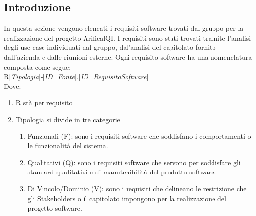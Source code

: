 

\subsection{Introduzione}
In questa sezione vengono elencati i requisiti software trovati dal gruppo per la realizzazione del progetto ArificalQI.
I requisiti sono stati trovati tramite l'analisi degli use case individuati dal gruppo, dal'analisi del capitolato fornito dall'azienda
e dalle riunioni esterne.
Ogni requisito software ha una nomenclatura composta come segue:\\[1em]
R[\textit{Tipologia}]-[\textit{ID\_Fonte}].[\textit{ID\_RequisitoSoftware}]\\[1em]
Dove:
\begin{enumerate}
    \item R stà per requisito
    \item Tipologia si divide in tre categorie
    \begin{enumerate}
        \item Funzionali (F): sono i requisiti software che soddisfano i comportamenti o le funzionalità del sistema.
        \item Qualitativi (Q): sono i requisiti software che servono per soddisfare gli standard qualitativi e di manutenibilità
        del prodotto software.
        \item Di Vincolo/Dominio (V): sono i requisiti che delineano le restrizione che gli Stakeholders o il capitolato impongono
         per la realizzazione del progetto software.
    \end{enumerate}
\end{enumerate}  